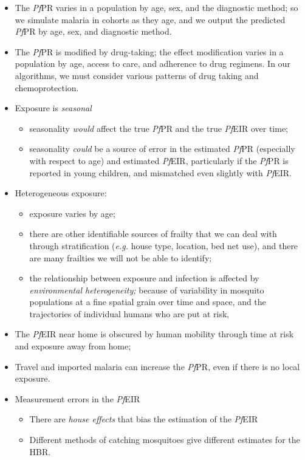 \documentclass[
]{book}
\begin{document}
\begin{itemize}
\item
  The \emph{Pf}PR varies in a population by age, sex, and the diagnostic method; so we simulate malaria in cohorts as they age, and we output the predicted \emph{Pf}PR by age, sex, and diagnostic method.
\item
  The \emph{Pf}PR is modified by drug-taking; the effect modification varies in a population by age, access to care, and adherence to drug regimens. In our algorithms, we must consider various patterns of drug taking and chemoprotection.
\item
  Exposure is \emph{seasonal}

  \begin{itemize}
  \item
    seasonality \emph{would} affect the true \emph{Pf}PR and the true \emph{Pf}EIR over time;
  \item
    seasonality \emph{could} be a source of error in the estimated \emph{Pf}PR (especially with respect to age) and estimated \emph{Pf}EIR, particularly if the \emph{Pf}PR is reported in young children, and mismatched even slightly with \emph{Pf}EIR.
  \end{itemize}
\item
  Heterogeneous exposure:

  \begin{itemize}
  \item
    exposure varies by age;
  \item
    there are other identifiable sources of frailty that we can deal with through stratification (\emph{e.g.} house type, location, bed net use), and there are many frailties we will not be able to identify;
  \item
    the relationship between exposure and infection is affected by \emph{environmental heterogeneity;} because of variability in mosquito populations at a fine spatial grain over time and space, and the trajectories of individual humans who are put at risk,
  \end{itemize}
\item
  The \emph{Pf}EIR near home is obscured by human mobility through time at risk and exposure away from home;
\item
  Travel and imported malaria can increase the \emph{Pf}PR, even if there is no local exposure.
\item
  Measurement errors in the \emph{Pf}EIR

  \begin{itemize}
  \item
    There are \emph{house effects} that bias the estimation of the \emph{Pf}EIR
  \item
    Different methods of catching mosquitoes give different estimates for the HBR.
  \end{itemize}
\end{itemize}
\end{document}

